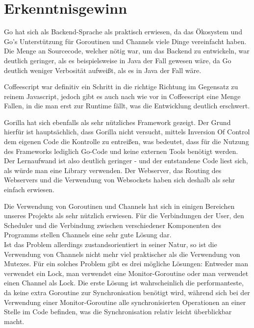 \section{Erkenntnisgewinn}
Go hat sich als Backend-Sprache als praktisch erwiesen, da das Ökosystem und Go's Unterstützung für Goroutinen und Channels viele Dinge vereinfacht haben. \\
Die Menge an Sourcecode, welcher nötig war, um das Backend zu entwickeln, war deutlich geringer, als es beispielsweise in Java der Fall gewesen wäre, da Go deutlich weniger Verbosität aufweißt, als es in Java der Fall wäre.

Coffeescript war definitiv ein Schritt in die richtige Richtung im Gegensatz zu reinem Javascript, jedoch gibt es auch nach wie vor in Coffeescript eine Menge Fallen, in die man erst zur Runtime fällt, was die Entwicklung deutlich erschwert.

Gorilla hat sich ebenfalls als sehr nützliches Framework gezeigt. Der Grund hierfür ist hauptsächlich, dass Gorilla nicht versucht, mittels Inversion Of Control dem eigenen Code die Kontrolle zu entreißen, was bedeutet, dass für die Nutzung des Frameworks lediglich Go-Code und keine externen Tools benötigt werden. Der Lernaufwand ist also deutlich geringer - und der entstandene Code liest sich, als würde man eine Library verwenden.
Der Webserver, das Routing des Webservers und die Verwendung von Websockets haben sich deshalb als sehr einfach erwiesen.

Die Verwendung von Goroutinen und Channels hat sich in einigen Bereichen unseres Projekts als sehr nützlich erwiesen. Für die Verbindungen der User, den Scheduler und die Verbindung zwischen verschiedener Komponenten des Programms stellen Channels eine sehr gute Lösung dar. \\
Ist das Problem allerdings zustandsorientiert in seiner Natur, so ist die Verwendung von Channels nicht mehr viel praktischer als die Verwendung von Mutexes. Für ein solches Problem gibt es drei mögliche Lösungen: Entweder man verwendet ein Lock, man verwendet eine Monitor-Goroutine oder man verwendet einen Channel als Lock. Die erste Lösung ist wahrscheinlich die performanteste, da keine extra Goroutine zur Synchronisation benötigt wird, während sich bei der Verwendung einer Monitor-Goroutine alle synchronisierten Operationen an einer Stelle im Code befinden, was die Synchronisation relativ leicht überblickbar macht.


